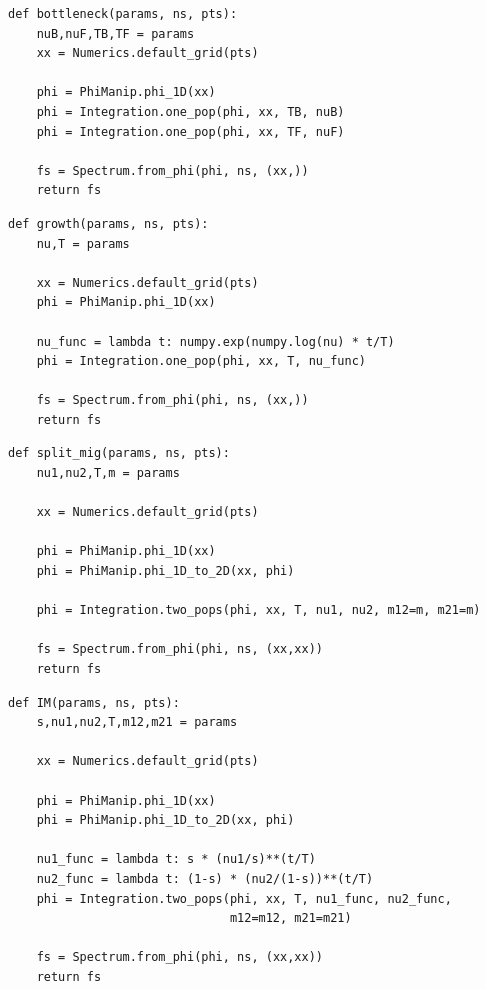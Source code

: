 \documentclass[12pt]{article}
\makeatletter
\newcommand{\py}[1]{\lstinline[language=Python, showstringspaces=False]@#1@}
\makeatother
\begin{document}
\begin{lstlisting}[caption={\textbf{Bottleneck:} At time \py{TF} + \py{TB} in the past, an equilibrium population goes through a bottleneck of depth \py{nuB}, recovering to relative size \py{nuF}.}, float, label={lst:bottleneck}]
def bottleneck(params, ns, pts):
    nuB,nuF,TB,TF = params
    xx = Numerics.default_grid(pts)
    
    phi = PhiManip.phi_1D(xx)
    phi = Integration.one_pop(phi, xx, TB, nuB)
    phi = Integration.one_pop(phi, xx, TF, nuF)

    fs = Spectrum.from_phi(phi, ns, (xx,))
    return fs
\end{lstlisting}

\begin{lstlisting}[caption={\textbf{Exponential growth:} At time \py{T} in the past, an equilibrium population begins growing exponentially, reaching size \py{nu} at present.}, float]
def growth(params, ns, pts):
    nu,T = params

    xx = Numerics.default_grid(pts)
    phi = PhiManip.phi_1D(xx)

    nu_func = lambda t: numpy.exp(numpy.log(nu) * t/T)
    phi = Integration.one_pop(phi, xx, T, nu_func)

    fs = Spectrum.from_phi(phi, ns, (xx,))
    return fs
\end{lstlisting}

\begin{lstlisting}[caption={\textbf{Split with migration:} At time \py{T} in the past, two population diverge from an equilibrium population, with relative sizes \py{nu1} and \py{nu2} and with symmetric migration at rate \py{m}.}, float]
def split_mig(params, ns, pts):
    nu1,nu2,T,m = params

    xx = Numerics.default_grid(pts)

    phi = PhiManip.phi_1D(xx)
    phi = PhiManip.phi_1D_to_2D(xx, phi)

    phi = Integration.two_pops(phi, xx, T, nu1, nu2, m12=m, m21=m)

    fs = Spectrum.from_phi(phi, ns, (xx,xx))
    return fs
\end{lstlisting}

\begin{lstlisting}[caption={\textbf{Two-population isolation-with-migration:} The ancestral population splits into two, with a fraction \py{s} going into pop 1 and fraction \py{1-s} into pop 2. The populations then grow exponentially, with asymmetric migration allowed between them.}, float]
def IM(params, ns, pts):
    s,nu1,nu2,T,m12,m21 = params

    xx = Numerics.default_grid(pts)

    phi = PhiManip.phi_1D(xx)
    phi = PhiManip.phi_1D_to_2D(xx, phi)

    nu1_func = lambda t: s * (nu1/s)**(t/T)
    nu2_func = lambda t: (1-s) * (nu2/(1-s))**(t/T)
    phi = Integration.two_pops(phi, xx, T, nu1_func, nu2_func,
                               m12=m12, m21=m21)

    fs = Spectrum.from_phi(phi, ns, (xx,xx))
    return fs
\end{lstlisting}
\end{document}
